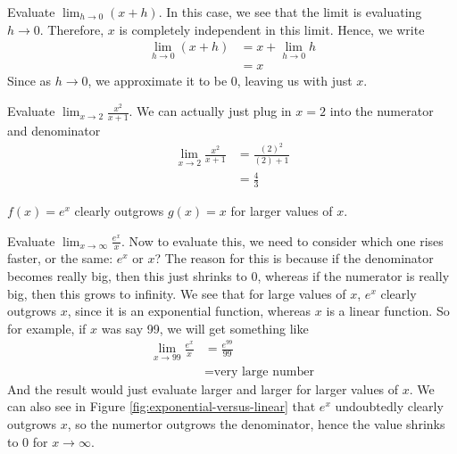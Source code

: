 \documentclass[working]{tuftebook}
\begin{document}
\begin{fullwidth}
\begin{eg}
    Evaluate $\displaystyle \lim_{h\to 0}(x+h)$. In this case, we see that the limit is evaluating $h\to0$. Therefore, $x$ is completely independent in this limit. Hence, we write
    \begin{align*}
        \lim_{h\to 0}(x+h)&=x+ \lim_{h\to 0}h\\ 
                          &=x
    \end{align*}
    Since as $h\to0$, we approximate it to be 0, leaving us with just $x$.
\end{eg}
\begin{eg}
    Evaluate $\displaystyle \lim_{x\to 2} \frac{x^2}{x+1}$. We can actually just plug in $x=2$ into the numerator and denominator 
    \begin{align*}
        \lim_{x\to 2} \frac{x^2}{x+1}&= \frac{(2)^2}{(2)+1}\\ 
                                     &= \frac{4}{3}
    \end{align*}
\end{eg}
\end{fullwidth}
\newpage 
\begin{marginfigure}
    \centering
    \caption{$f(x)=e^x$ clearly outgrows $g(x)=x$ for larger values of $x$.}
    \label{fig:exponential-versus-linear}
\end{marginfigure}
\begin{eg}
    Evaluate $\displaystyle \lim_{x\to \infty } \frac{e^x}{x}$. Now to evaluate this, we need to consider which one rises faster, or the same: $e^x$ or $x$? The reason for this is because if the denominator becomes really big, then this just shrinks to 0, whereas if the numerator is really big, then this grows to infinity. We see that for large values of $x$, $e^x$ clearly outgrows $x$, since it is an exponential function, whereas $x$ is a linear function. So for example, if $x$ was say 99, we will get something like 
    \begin{align*}
        \lim_{x\to 99} \frac{e^x}{x}&=\frac{e^{99}}{99}\\
        &= \text{very large number}
    \end{align*}
    And the result would just evaluate larger and larger for larger values of $x$.
    We can also see in Figure \ref{fig:exponential-versus-linear} that $e^x$ undoubtedly clearly outgrows $x$, so the numertor outgrows the denominator, hence the value shrinks to 0 for $x\to \infty $.
\end{eg}
\end{document}
